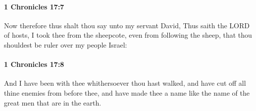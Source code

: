 		\paragraph{1 Chronicles 17:7} %
			\label{1CHRONICLES-17-7}

			Now therefore thus shalt thou say unto my servant David, Thus saith the LORD of hosts, I took thee from the sheepcote, even from following the sheep, that thou shouldest be ruler over my people Israel:


		\paragraph{1 Chronicles 17:8} %
			\label{1CHRONICLES-17-8}

			And I have been with thee whithersoever thou hast walked, and have cut off all thine enemies from before thee, and have made thee a name like the name of the great men that are in the earth.

